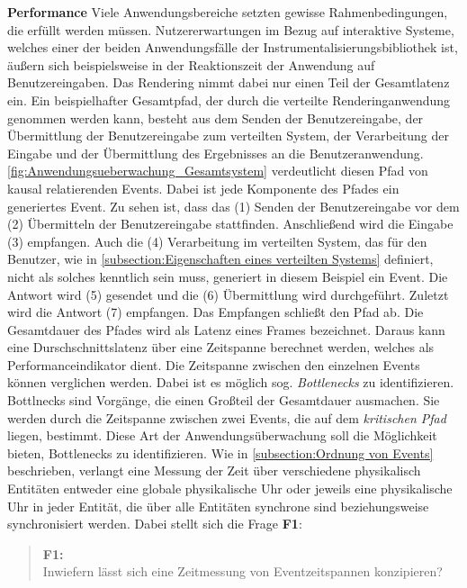 \textbf{Performance} \space\space\space 
Viele Anwendungsbereiche setzten gewisse Rahmenbedingungen, die erfüllt werden müssen. 
Nutzererwartungen im Bezug auf interaktive Systeme, welches einer der beiden Anwendungsfälle der Instrumentalisierungsbibliothek ist, äußern sich beispielsweise in der Reaktionszeit der Anwendung auf Benutzereingaben. 
Das Rendering nimmt dabei nur einen Teil der Gesamtlatenz ein.
Ein beispielhafter Gesamtpfad, der durch die verteilte Renderinganwendung genommen werden kann, besteht aus dem Senden der Benutzereingabe, der Übermittlung der Benutzereingabe zum verteilten System, der Verarbeitung der Eingabe und der Übermittlung des Ergebnisses an die Benutzeranwendung.
\cref{fig:Anwendungsueberwachung_Gesamtsystem} verdeutlicht diesen Pfad von kausal relatierenden Events.
Dabei ist jede Komponente des Pfades ein generiertes Event.
Zu sehen ist, dass das (1) Senden der Benutzereingabe vor dem (2) Übermitteln der Benutzereingabe stattfinden.
Anschließend wird die Eingabe (3) empfangen.
Auch die (4) Verarbeitung im verteilten System, das für den Benutzer, wie in \cref{subsection:Eigenschaften eines verteilten Systems} definiert, nicht als solches kenntlich sein muss, generiert in diesem Beispiel ein Event.
Die Antwort wird (5) gesendet und die (6) Übermittlung wird durchgeführt.
Zuletzt wird die Antwort (7) empfangen. Das Empfangen schließt den Pfad ab. Die Gesamtdauer des Pfades wird als Latenz eines Frames bezeichnet.
Daraus kann eine Durschschnittslatenz über eine Zeitspanne berechnet werden, welches als Performanceindikator dient. Die Zeitspanne zwischen den einzelnen Events können verglichen werden. Dabei ist es möglich sog. \emph{Bottlenecks} zu identifizieren. Bottlnecks sind Vorgänge, die einen Großteil der Gesamtdauer ausmachen. Sie werden durch die Zeitspanne zwischen zwei Events, die auf dem \emph{kritischen Pfad} liegen, bestimmt. Diese Art der Anwendungsüberwachung soll die Möglichkeit bieten, Bottlenecks zu identifizieren. Wie in \cref{subsection:Ordnung von Events} beschrieben, verlangt eine Messung der Zeit über verschiedene physikalisch Entitäten entweder eine globale physikalische Uhr oder jeweils eine physikalische Uhr in jeder Entität, die über alle Entitäten synchrone sind beziehungsweise synchronisiert werden. Dabei stellt sich die Frage \textbf{F1}:

\begin{quote}
	\cbstart
		\textbf{F1:}\\
		Inwiefern lässt sich eine Zeitmessung von Eventzeitspannen konzipieren?
	\cbend
\end{quote}

